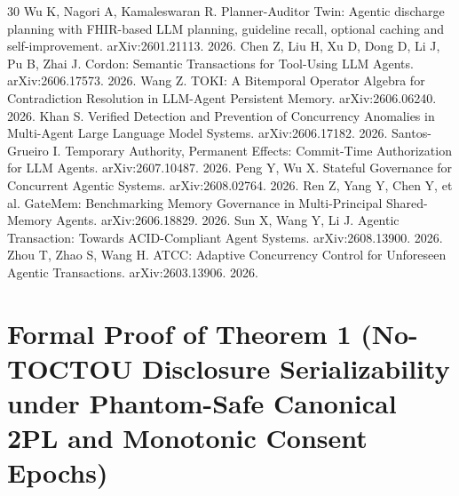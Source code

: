 \documentclass[11pt]{article}
\begin{document}
\begin{thebibliography}{30}
 Wu K, Nagori A, Kamaleswaran R. Planner-Auditor Twin: Agentic discharge planning with FHIR-based LLM planning, guideline recall, optional caching and self-improvement. arXiv:2601.21113. 2026.
 Chen Z, Liu H, Xu D, Dong D, Li J, Pu B, Zhai J. Cordon: Semantic Transactions for Tool-Using LLM Agents. arXiv:2606.17573. 2026.
 Wang Z. TOKI: A Bitemporal Operator Algebra for Contradiction Resolution in LLM-Agent Persistent Memory. arXiv:2606.06240. 2026.
 Khan S. Verified Detection and Prevention of Concurrency Anomalies in Multi-Agent Large Language Model Systems. arXiv:2606.17182. 2026.
 Santos-Grueiro I. Temporary Authority, Permanent Effects: Commit-Time Authorization for LLM Agents. arXiv:2607.10487. 2026.
 Peng Y, Wu X. Stateful Governance for Concurrent Agentic Systems. arXiv:2608.02764. 2026.
 Ren Z, Yang Y, Chen Y, et al. GateMem: Benchmarking Memory Governance in Multi-Principal Shared-Memory Agents. arXiv:2606.18829. 2026.
 Sun X, Wang Y, Li J. Agentic Transaction: Towards ACID-Compliant Agent Systems. arXiv:2608.13900. 2026.
 Zhou T, Zhao S, Wang H. ATCC: Adaptive Concurrency Control for Unforeseen Agentic Transactions. arXiv:2603.13906. 2026.
\end{thebibliography}

\newpage
\appendix
\section{Formal Proof of Theorem 1 (No-TOCTOU Disclosure Serializability under Phantom-Safe Canonical 2PL and Monotonic Consent Epochs)}
\label{sec:proofs}
\end{document}
